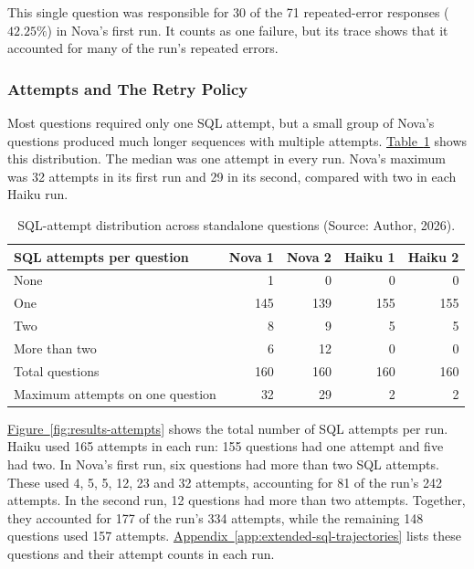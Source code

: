This single question was responsible for 30 of the 71 repeated-error responses ($42.25\%$)
in Nova's first run. 
It counts as one failure, but its trace shows that it accounted for
many of the run's repeated errors.

\subsubsection{Attempts and The Retry Policy}
Most questions required only one SQL attempt, but a small group of Nova's
questions produced much longer sequences with multiple attempts.
\hyperref[tab:results-attempt-distribution]{Table~\ref*{tab:results-attempt-distribution}}
shows this distribution. The median was one attempt in every run. 
Nova's maximum was 32 attempts
in its first run and 29 in its second, 
compared with two in each Haiku run.

\begin{table}[H]
\centering
{\small
\setlength{\tabcolsep}{4pt}
\begin{tabularx}{\textwidth}{@{}>{\raggedright\arraybackslash}Xrrrr@{}}
\toprule
\textbf{SQL attempts per question} & \textbf{Nova 1} & \textbf{Nova 2} & \textbf{Haiku 1} & \textbf{Haiku 2} \\
\midrule
None & 1 & 0 & 0 & 0 \\
\addlinespace[0.4em]
One & 145 & 139 & 155 & 155 \\
\addlinespace[0.4em]
Two & 8 & 9 & 5 & 5 \\
\addlinespace[0.4em]
More than two & 6 & 12 & 0 & 0 \\
\midrule
Total questions & 160 & 160 & 160 & 160 \\
Maximum attempts on one question & 32 & 29 & 2 & 2 \\
\bottomrule
\end{tabularx}
}
\caption{SQL-attempt distribution across standalone questions (Source: Author, 2026).}
\label{tab:results-attempt-distribution}
\end{table}

\hyperref[fig:results-attempts]{Figure~\ref*{fig:results-attempts}} shows the
total number of SQL attempts per run. 
Haiku used 165 attempts in each run:
155 questions had one attempt and five had two.
In Nova's first run, six questions had more than two SQL attempts.
These used 4, 5, 5, 12, 23 and 32 attempts, accounting for 81 of the run's 242 attempts. 
In the second run, 12 questions had more than two attempts.
Together, they accounted for 177 of the run's 334 attempts, 
while the remaining 148 questions used 157 attempts.
\hyperref[app:extended-sql-trajectories]{Appendix~\ref*{app:extended-sql-trajectories}}
lists these questions and their attempt counts in each run.

